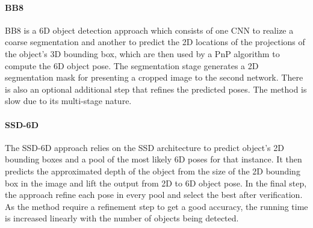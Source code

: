 \paragraph{BB8}
BB8 \cite{rad2017bb8} is a 6D object detection approach which consists of one CNN to realize a coarse segmentation and another to predict the 2D locations of the projections of the object’s 3D bounding box, which are then used by a PnP algorithm to compute the 6D object pose. The segmentation stage generates a 2D segmentation mask for presenting a cropped image to the second network. There is also an optional additional step that refines the predicted poses. The method is slow due to its multi-stage nature.

\paragraph{SSD-6D}
The SSD-6D \cite{kehl2017ssd} approach relies on the SSD architecture to predict object's 2D bounding boxes and a pool of the most likely 6D poses for that instance. It then predicts the approximated depth of the object from the size of the 2D bounding box in the image and lift the output from 2D to 6D object pose. In the final step, the approach refine each pose in every
pool and select the best after verification. As the method require a refinement step to get a good accuracy, the running time is increased linearly with the number of objects being detected.